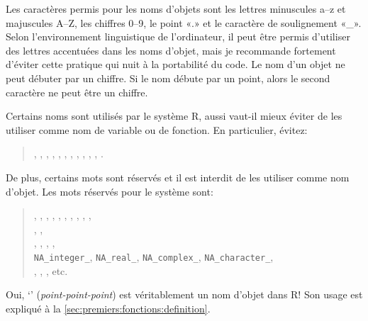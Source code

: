 Les caractères permis pour les noms d'objets sont les lettres
minuscules a--z et majuscules A--Z, les chiffres 0--9, le point «.» et
le caractère de soulignement «\_». Selon l'environnement linguistique
de l'ordinateur, il peut être permis d'utiliser des lettres accentuées
dans les noms d'objet, mais je recommande fortement d'éviter cette
pratique qui nuit à la portabilité du code. Le nom d'un objet ne peut
débuter par un chiffre. Si le nom débute par un point, alors le second
caractère ne peut être un chiffre.


Certains noms sont utilisés par le système R, aussi vaut-il mieux
éviter de les utiliser comme nom de variable ou de fonction. En
particulier, évitez:
\begin{quote}
  , , , , ,
  , , , ,
  , , .
\end{quote}
De plus, certains mots sont réservés et il est interdit de les
utiliser comme nom d'objet. Les mots réservés pour le système sont:
\begin{quote}
  , , , , ,
  , , , , , \\
  , , \\
  , , , , \\
  \verb|NA_integer_|, \verb|NA_real_|, \verb|NA_complex_|,
  \verb|NA_character_|, \\
  , , , etc.
\end{quote}
Oui, `' (\emph{point-point-point}) est véritablement un nom
d'objet dans R! Son usage est expliqué à la
\autoref{sec:premiers:fonctions:definition}.

